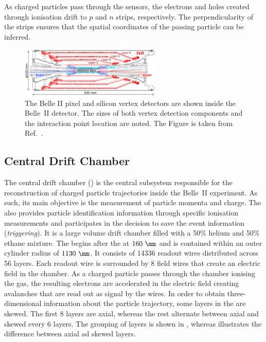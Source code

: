 As charged particles pass through the \SVD sensors, the electrons and holes created through ionisation drift to $p$ and $n$ strips, respectively.
The perpendicularity of the strips ensures that the spatial coordinates of the passing particle can be inferred.

\begin{figure}[htbp!]
    \centering
    \includegraphics[width=0.6\textwidth]{figures/experimental_setup/vxd.png}
    \caption{\label{fig:vxd}
    The Belle II pixel and silicon vertex detectors are shown inside the Belle~II detector.
    The sizes of both vertex detection components and the interaction point location are noted.
    The Figure is taken from Ref.~\cite{Belle-IISVD:2023mxk}.
    }
\end{figure}

\subsection{Central Drift Chamber}\label{sec:cdc}

The central drift chamber (\CDC) \cite{Taniguchi:2017not} is the central subsystem responsible for the reconstruction of charged particle trajectories inside the Belle~II experiment.
As such, its main objective is the measurement of particle momenta and charge.
The \CDC also provides particle identification information through specific ionisation measurements
and participates in the decision to save the event information (\textit{triggering}).
It is a large volume drift chamber filled with a 50\% helium and 50\% ethane mixture.
The \CDC begins after the \SVD at $160~\mm$ and is contained within an outer cylinder radius of $1130~\mm$.
It consists of 14336 readout wires distributed across 56 layers.
Each readout wire is surrounded by 8 field wires that create an electric field in the chamber.
As a charged particle passes through the chamber ionising the gas,
the resulting electrons are accelerated in the electric field creating avalanches that are read out as signal by the wires.
In order to obtain three-dimensional information about the particle trajectory,
some layers in the \CDC are skewed.
The first 8 layers are axial, whereas the rest alternate between axial and skewed every 6 layers.
The grouping of layers is shown in , whereas  illustrates the difference between axial ad skewed layers.

